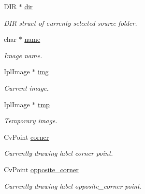 \begin{DoxyCompactItemize}
\mbox{\label{structdata_a982e44c617f0d026ecb822aef1281eb4}} 
D\+IR $\ast$ \hyperlink{structdata_a982e44c617f0d026ecb822aef1281eb4}{dir}
\begin{DoxyCompactList}\small\item\em D\+IR struct of currenty selected source folder. \end{DoxyCompactList}\item 
\mbox{\label{structdata_aff8dbc1c6d3f00253a3c8c14e6e4b52f}} 
char $\ast$ \hyperlink{structdata_aff8dbc1c6d3f00253a3c8c14e6e4b52f}{name}
\begin{DoxyCompactList}\small\item\em Image name. \end{DoxyCompactList}\item 
\mbox{\label{structdata_a203504cce309b8995bf1b1a28e6a5b9a}} 
Ipl\+Image $\ast$ \hyperlink{structdata_a203504cce309b8995bf1b1a28e6a5b9a}{img}
\begin{DoxyCompactList}\small\item\em Current image. \end{DoxyCompactList}\item 
\mbox{\label{structdata_a11ef77f1421b7d825f50d47739ec35bc}} 
Ipl\+Image $\ast$ \hyperlink{structdata_a11ef77f1421b7d825f50d47739ec35bc}{tmp}
\begin{DoxyCompactList}\small\item\em Temporary image. \end{DoxyCompactList}\item 
\mbox{\label{structdata_a32b326187c30d5867ce3a2e6f0b27f3d}} 
Cv\+Point \hyperlink{structdata_a32b326187c30d5867ce3a2e6f0b27f3d}{corner}
\begin{DoxyCompactList}\small\item\em Currently drawing label corner point. \end{DoxyCompactList}\item 
\mbox{\label{structdata_a861f3aec303229379d972db6971fb118}} 
Cv\+Point \hyperlink{structdata_a861f3aec303229379d972db6971fb118}{opposite\+\_\+corner}
\begin{DoxyCompactList}\small\item\em Currently drawing label opposite\+\_\+corner point. \end{DoxyCompactList}\item 

\end{DoxyCompactItemize}
